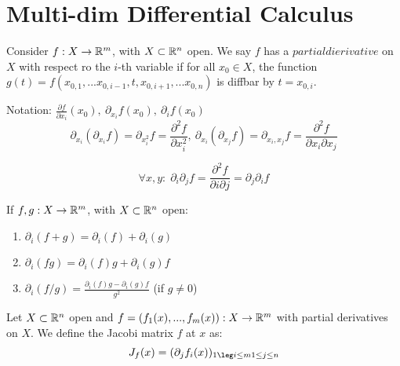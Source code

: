 \chapter{Multi-dim Differential Calculus}

\begin{definition}
	Consider $f: X \to \mathbb{R}^m$, with $X \subset \mathbb{R}^n$ open.
	We say $f$ has a $partial dierivative$ on $X$ with respect ro the $i$-th variable if for all $x_0 \in X$, the function $g(t) = f(x_{0,1},...x_{0,i-1},t,x_{0,i+1},...x_{0,n})$ is diffbar by $t = x_{0,i}$.
	
	Notation: $\frac{\partial f}{\partial x_i}(x_0), \ \partial_{x_i}f(x_0), \ \partial_if(x_0)$
	$$\partial_{x_i}(\partial_{x_i} f) = \partial_{x_i^2}f = \frac{\partial^2 f}{\partial x_i^2}, \ \partial_{x_i}(\partial_{x_j} f) = \partial_{x_i, x_j}f = \frac{\partial^2 f}{\partial x_i \partial x_j}$$
\end{definition}

\begin{theorem}
	$$\forall x,y:\; \partial_i \partial_j f = \frac{\partial^2 f}{\partial i \partial j} = \partial_j \partial_i f$$
\end{theorem}

\begin{proposition}
	If $f,g: X \to \mathbb{R}^m$, with $X \subset \mathbb{R}^n$ open:
	\begin{enumerate}
		\item $\partial_i(f+g) = \partial_i(f) + \partial_i(g)$
		\item $\partial_i(fg) = \partial_i(f)g + \partial_i(g)f$
		\item $\partial_i(f/g) = \frac{\partial_i(f)g - \partial_i(g)f}{g^2}$ (if $g \neq 0$)
	\end{enumerate}
\end{proposition}

\begin{definition}
	Let $X \subset \mathbb{R}^n$ open and $f=(f_1(x), ..., f_m(x)): X \to \mathbb{R}^m$ with partial derivatives on $X$.
	We define the Jacobi matrix $f$ at $x$ as:
	$$J_f(x) = (\partial_jf_i(x))_{1 \leg i \leq m \\ 1 \leq j \leq n}$$
\end{definition}


